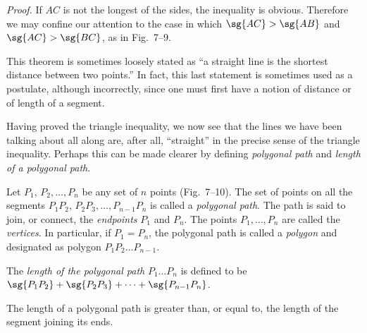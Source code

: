 \documentclass[11pt]{book}
\theoremstyle{bkplain}
\theoremstyle{XIplainnote}
\theoremstyle{bkplain}
\theoremstyle{bkplain}
\begin{document}
\FIGVIININETEN

\noindent\emph{Proof.}\quad
If $AC$ is not the longest of the sides, the inequality is obvious. Therefore
we may confine our attention to the case in which $\sg{AC} > \sg{AB}$ and
$\sg{AC} > \sg{BC}$, as in Fig.~7--9.

\begin{steps}
\end{steps}

\begin{remark}
This theorem is sometimes loosely stated as ``a straight line is the shortest
distance between two points.'' In fact, this last statement is sometimes used
as a postulate, although incorrectly, since one must first have a notion of
distance or of length of a segment.
\end{remark}

Having proved the triangle inequality, we now see that the lines we have been
talking about all along are, after all, ``straight'' in the precise sense of
the triangle inequality. Perhaps this can be made clearer by defining
\emph{polygonal path} and \emph{length of a polygonal path}.

\begin{definition}
Let $P_1$, $P_2,\ldots, P_n$ be any set of $n$ points (Fig.~7--10). The set of
points on all the segments $P_1P_2$, $P_2P_3,\ldots, P_{n-1}P_n$ is called a
\emph{polygonal path}. The path is said to join, or connect, the
\emph{endpoints} $P_1$ and $P_n$. The points $P_1,\ldots, P_n$ are called the
\emph{vertices}. In particular, if $P_1 = P_n$, the polygonal path is called a
\emph{polygon} and designated as polygon $P_1P_2\ldots P_{n-1}$.
\end{definition}

\begin{definition}
The \emph{length of the polygonal path} $P_1\ldots P_n$ is defined to be
$\sg{P_1P_2} + \sg{P_2P_3} + \cdots + \sg{P_{n-1}P_n}$.
\end{definition}

\begin{corollary}
The length of a polygonal path is greater than, or equal to, the length of the
segment joining its ends.
\end{corollary}
\end{document}
